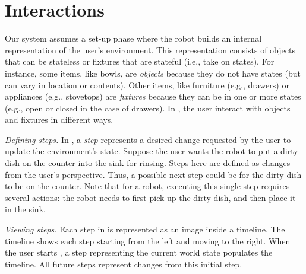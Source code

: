 \section{\projname Interactions}
Our system assumes a set-up phase where the robot builds an internal representation of the user's environment. This representation consists of objects that can be stateless or fixtures that are stateful (i.e., take on states). For instance, some items, like bowls, are \textit{objects} because they do not have states (but can vary in location or contents). Other items, like furniture (e.g., drawers) or appliances (e.g., stovetops) are \textit{fixtures} because they can be in one or more states (e.g., open or closed in the case of drawers). In \projname, the user interact with objects and fixtures in different ways. 



\emph{Defining steps.} In \projname, a \textit{step} represents a desired change requested by the user to update the environment's state. Suppose the user wants the robot to put a dirty dish on the counter into the sink for rinsing. Steps here are defined as changes from the user's perspective. Thus, a possible next step could be for the dirty dish to be on the counter. Note that for a robot, executing this single step requires several actions: the robot needs to first pick up the dirty dish, and then place it in the sink.

\emph{Viewing steps.} Each step in \projname is represented as an image inside a timeline. The timeline shows each step starting from the left and moving to the right. When the user starts \projname, a step representing the current world state populates the timeline. All future steps represent changes from this initial step.

